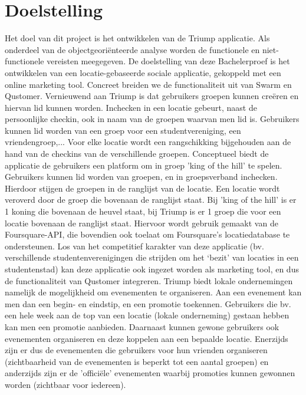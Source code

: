 
\chapter{Doelstelling}

Het doel van dit project is het ontwikkelen van de Triump applicatie. Als onderdeel van de objectgeoriënteerde analyse worden de functionele en niet-functionele vereisten meegegeven.
De doelstelling van deze Bachelerproef is het ontwikkelen van een locatie-gebaseerde sociale applicatie, gekoppeld met een online marketing tool. Concreet breiden we de functionaliteit uit van Swarm en Qustomer. Vernieuwend aan Triump is dat gebruikers groepen kunnen creëren en hiervan lid kunnen worden. Inchecken in een locatie gebeurt, naast de persoonlijke checkin, ook in naam van de groepen waarvan men lid is. Gebruikers kunnen lid worden van een groep voor een studentvereniging, een vriendengroep,...
Voor elke locatie wordt een rangschikking bijgehouden aan de hand van de checkins van de verschillende groepen. Conceptueel biedt de applicatie de gebruikers een platform om in groep 'king of the hill' te spelen. Gebruikers kunnen lid worden van groepen, en in groepsverband inchecken. Hierdoor stijgen de groepen in de ranglijst van de locatie. Een locatie wordt veroverd door de groep die bovenaan de ranglijst staat.
Bij 'king of the hill' is er 1 koning die bovenaan de heuvel staat, bij Triump is er 1 groep die voor een locatie bovenaan de ranglijst staat.
Hiervoor wordt gebruik gemaakt van de Foursquare-API, die bovendien ook toelaat om Foursquare's locatiedatabase te ondersteunen.
Los van het competitief karakter van deze applicatie (bv. verschillende studentenverenigingen die strijden om het ‘bezit’ van locaties in een studentenstad) kan deze applicatie ook ingezet worden als marketing tool, en dus de functionaliteit van Qustomer integreren.
Triump biedt lokale ondernemingen namelijk de mogelijkheid om evenementen te organiseren. Aan een evenement kan men dan een begin- en eindstip, en een promotie toekennen. Gebruikers die bv. een hele week aan de top van een locatie (lokale onderneming) gestaan hebben kan men een promotie aanbieden. Daarnaast kunnen gewone gebruikers ook evenementen organiseren en deze koppelen aan een bepaalde locatie.
Enerzijds zijn er dus de evenementen die gebruikers voor hun vrienden organiseren (zichtbaarheid van de evenementen is beperkt tot een aantal groepen) en anderzijds zijn er de 'officiële' evenementen waarbij promoties kunnen gewonnen worden (zichtbaar voor iedereen).

